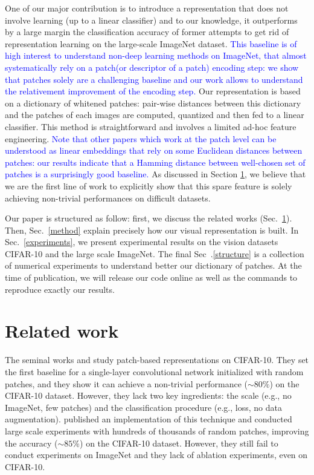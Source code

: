 \documentclass{article}
\newcommand{\Edouard}[1]{\textcolor{blue}{#1}}
\begin{document}
One of our major contribution is to introduce a representation that does not involve learning (up to a linear classifier) and to our knowledge, it outperforms by a large margin the classification accuracy of former attempts to get rid of representation learning on the large-scale ImageNet dataset. \Edouard{This baseline is of high interest to understand non-deep learning methods on ImageNet, that almost systematically rely on a patch(or descriptor of a patch) encoding step: we show that patches solely are a challenging baseline and our work allows to understand the relativement improvement of the encoding step.} Our representation is based on a dictionary of whitened patches: pair-wise distances between this dictionary and the patches of each images are computed, quantized and then fed to a linear classifier. This method is  straightforward and involves a limited ad-hoc feature engineering. \Edouard{Note that other papers which work at the patch level can be understood as linear embeddings that rely on some Euclidean distances between patches: our results indicate that a Hamming distance between well-chosen set of patches is a surprisingly good baseline. }As discussed in Section \ref{related_work}, we believe that we are the first line of work to explicitly show that this  spare feature is solely achieving non-trivial performances on difficult datasets.

Our paper is structured as follow: first, we discuss the related works (Sec.~\ref{related_work}). Then, Sec.~\ref{method} explain precisely how our visual representation is built. In Sec.~\ref{experiments}, we present experimental results on the vision datasets CIFAR-10 and the large scale  ImageNet. The final Sec~.\ref{structure} is a collection of numerical experiments to understand better our dictionary of patches. At the time of publication, we will release our code online as well as the commands to reproduce exactly our results.


\section{Related work}
\label{related_work}

The seminal works \cite{coates2011analysis} and \cite{coates2011importance}  study patch-based representations on CIFAR-10.
They set the first baseline for a single-layer convolutional network initialized with random patches, and they show it  can achieve a non-trivial performance ($\sim 80 \%$) on the CIFAR-10 dataset. However, they lack two key ingredients: the scale (e.g., no ImageNet, few patches) and the classification procedure (e.g., loss, no data augmentation).
 \cite{recht2019imagenet} published an implementation of this technique and conducted large scale experiments with hundreds of thousands of random patches, improving the accuracy ($\sim 85 \%$) on the CIFAR-10 dataset.
However, they still fail to conduct experiments on ImageNet and they lack of   ablation experiments, even on CIFAR-10.
\end{document}
